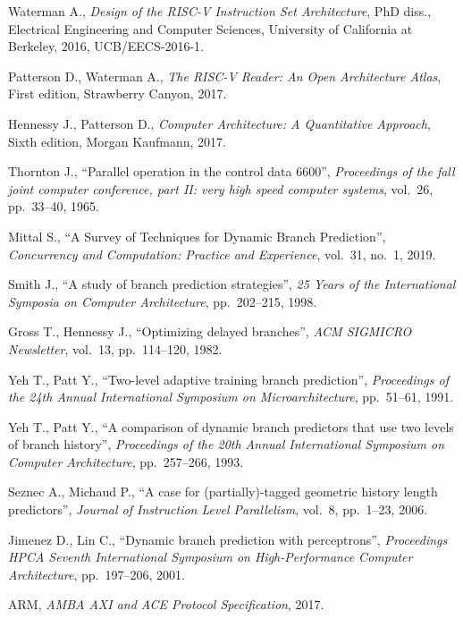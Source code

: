 \begin{thebibliography}{99}
\setlength{\parskip}{0.5\baselineskip}

    Waterman A., 
    \textit{Design of the RISC-V Instruction Set Architecture},
    PhD diss.,
    Electrical Engineering and Computer Sciences,
    University of California at Berkeley,
    2016,
    UCB/EECS-2016-1.

    Patterson D., Waterman A., 
    \textit{The RISC-V Reader: An Open Architecture Atlas},
    First edition,
    Strawberry Canyon,
    2017.

    Hennessy J., Patterson D., 
    \textit{Computer Architecture: A Quantitative Approach},
    Sixth edition,
    Morgan Kaufmann,
    2017.

    Thornton J.,
    ``Parallel operation in the control data 6600'',  
    \textit{Proceedings of the fall joint computer conference, part II: very high speed computer systems},
    vol.~26, pp.~33--40, 
    1965.

    Mittal S.,
    ``A Survey of Techniques for Dynamic Branch Prediction'',  
    \textit{Concurrency and Computation: Practice and Experience},
    vol.~31, no.~1, 
    2019.

    Smith J.,
    ``A study of branch prediction strategies'',  
    \textit{25 Years of the International Symposia on Computer Architecture},
    pp.~202--215, 
    1998.

    Gross T., Hennessy J.,
    ``Optimizing delayed branches'',  
    \textit{ACM SIGMICRO Newsletter},
    vol.~13, pp.~114--120, 
    1982.
    
    Yeh T., Patt Y.,
    ``Two-level adaptive training branch prediction'',  
    \textit{Proceedings of the 24th Annual International Symposium on Microarchitecture},
    pp.~51--61, 
    1991.

    Yeh T., Patt Y.,
    ``A comparison of dynamic branch predictors that use two levels of branch history'',  
    \textit{Proceedings of the 20th Annual International
    Symposium on Computer Architecture},
    pp.~257--266, 
    1993.

    Seznec A., Michaud P.,
    ``A case for (partially)-tagged geometric history length predictors'',  
    \textit{Journal of Instruction Level Parallelism},
    vol.~8, pp.~1--23, 
    2006.

    Jimenez D., Lin C.,
    ``Dynamic branch prediction with perceptrons'',  
    \textit{Proceedings HPCA Seventh International Symposium on High-Performance Computer Architecture},
    pp.~197--206, 
    2001.

    ARM, 
    \textit{AMBA AXI and ACE Protocol Specification},
    2017.

\end{thebibliography}